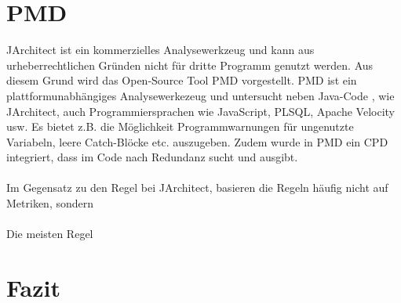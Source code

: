 \documentclass[12pt]{article}
\begin{document}
\section{PMD}\label{tools}

JArchitect ist ein kommerzielles Analysewerkzeug und kann aus
urheberrechtlichen Gründen nicht für dritte Programm genutzt
werden. Aus diesem Grund wird das Open-Source Tool PMD
vorgestellt. PMD ist ein plattformunabhängiges Analysewerkezeug
und untersucht neben Java-Code , wie JArchitect, auch
Programmiersprachen wie JavaScript, PLSQL, Apache Velocity usw.
Es bietet z.B. die Möglichkeit Programmwarnungen für ungenutzte
Variabeln, leere Catch-Blöcke etc. auszugeben. Zudem wurde in PMD
ein CPD integriert, dass im Code nach Redundanz sucht und
ausgibt.\\
\\
Im Gegensatz zu den Regel bei JArchitect, basieren die
Regeln häufig nicht auf Metriken, sondern
\\
\\
Die meisten Regel



\section{Fazit}\label{fazit}

\newpage


{}
\end{document}
